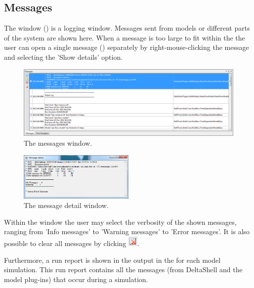 \subsection{Messages}
\label{subsec:messages}
%
The  window () is a logging window. Messages sent from models or different parts of the system are shown here. When a message is too large to fit within the  the user can open a single message () separately by right-mouse-clicking the message and selecting the 'Show details' option.
%
\begin{figure} [H]
	\centering
		\includegraphics[width=\textwidth]{Figures/Chapter_overview/view_messages_window.png}
	\caption{The messages window.}
	\label{fig:messageswindow}
\end{figure}
%
\begin{figure} [H]
	\centering
		\includegraphics[width=0.5\textwidth]{Figures/Chapter_overview/view_messagedetails_window.png}
	\caption{The message detail window.}
	\label{fig:messagedetailwindow}
\end{figure} 

Within the  window the user may select the verbosity of the shown messages, ranging from 'Info messages' to 'Warning messages' to 'Error messages'. It is also possible to clear all messages by clicking \includegraphics[height=5mm]{Figures/Chapter_overview/icon_clear_all_messages}.

Furthermore, a run report is shown in the output in the  for each model simulation. This run report contains all the messages (from DeltaShell and the model plug-ins) that occur during a simulation.

